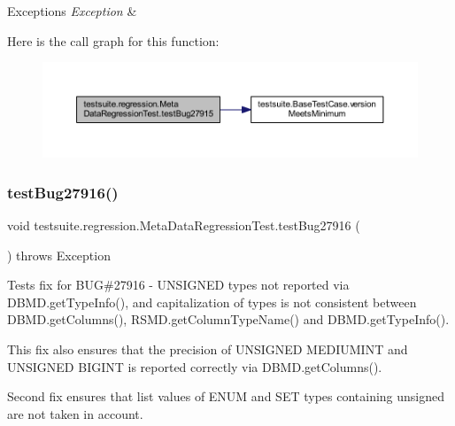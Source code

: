 \begin{DoxyExceptions}{Exceptions}
{\em Exception} & \\
\hline
\end{DoxyExceptions}
Here is the call graph for this function\+:
\nopagebreak
\begin{figure}[H]
\begin{center}
\leavevmode
\includegraphics[width=350pt]{classtestsuite_1_1regression_1_1_meta_data_regression_test_a32361bc11ddd1b2990adfa15697e27ae_cgraph}
\end{center}
\end{figure}
\mbox{\label{classtestsuite_1_1regression_1_1_meta_data_regression_test_a360ac39f54be19d70c9d43f584bc6f0f}} 
\subsubsection{\texorpdfstring{test\+Bug27916()}{testBug27916()}}
{\footnotesize\ttfamily void testsuite.\+regression.\+Meta\+Data\+Regression\+Test.\+test\+Bug27916 (\begin{DoxyParamCaption}{ }\end{DoxyParamCaption}) throws Exception}

Tests fix for B\+UG\#27916 -\/ U\+N\+S\+I\+G\+N\+ED types not reported via D\+B\+M\+D.\+get\+Type\+Info(), and capitalization of types is not consistent between D\+B\+M\+D.\+get\+Columns(), R\+S\+M\+D.\+get\+Column\+Type\+Name() and D\+B\+M\+D.\+get\+Type\+Info().

This fix also ensures that the precision of U\+N\+S\+I\+G\+N\+ED M\+E\+D\+I\+U\+M\+I\+NT and U\+N\+S\+I\+G\+N\+ED B\+I\+G\+I\+NT is reported correctly via D\+B\+M\+D.\+get\+Columns().

Second fix ensures that list values of E\+N\+UM and S\+ET types containing \textquotesingle{}unsigned\textquotesingle{} are not taken in account.


